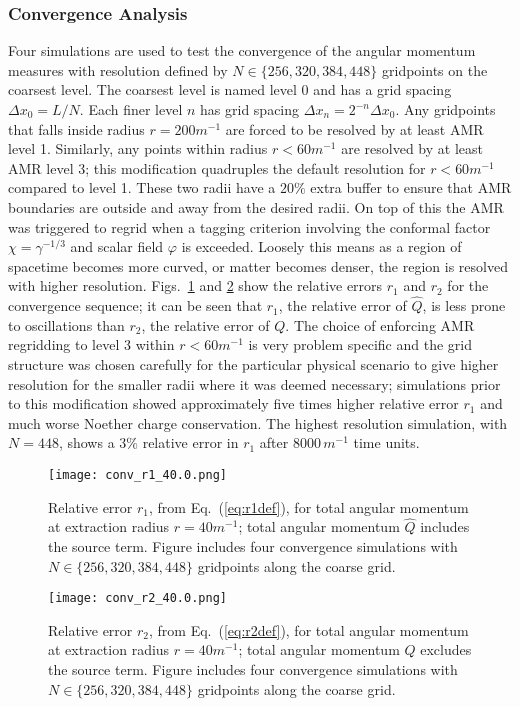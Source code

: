\subsubsection{Convergence Analysis}

Four simulations are used to test the convergence of the angular momentum measures with resolution defined by $N\in\{256,320,384,448\}$ gridpoints on the coarsest level. The coarsest level is named level $0$ and has a grid spacing $\Delta x_0 = L/N$. Each finer level $n$ has grid spacing $\Delta x_n = 2^{-n} \Delta x_0$. Any gridpoints that falls inside radius $r= 200 m^{-1}$ are forced to be resolved by at least AMR level 1. Similarly, any points within radius $r<60 m^{-1}$ are resolved by at least AMR level 3; this modification quadruples the default resolution for $r<60 m^{-1}$ compared to level 1. These two radii have a $20\%$ extra buffer to ensure that AMR boundaries are outside and away from the desired radii. On top of this the AMR was triggered to regrid when a tagging criterion involving the conformal factor $\chi = \gamma^{-1/3}$ and scalar field $\varphi$ is exceeded. Loosely this means as a region of spacetime becomes more curved, or matter becomes denser, the region is resolved with higher resolution. Figs.~\ref{fig:r1} and \ref{fig:r2} show the relative errors $r_1$ and $r_2$ for the convergence sequence; it can be seen that $r_1$, the relative error of $\hat Q$, is less prone to oscillations than $r_2$, the relative error of $Q$. The choice of enforcing AMR regridding to level 3 within $r<60 m^{-1}$ is very problem specific and the grid structure was chosen carefully for the particular physical scenario to give higher resolution for the smaller radii where it was deemed necessary; simulations prior to this modification showed approximately five times higher relative error $r_1$ and much worse Noether charge conservation. The highest resolution simulation, with $N=448$, shows a $3\%$ relative error in $r_1$ after $8000 \,m^{-1}$ time units.

\begin{figure}[h]
{\texttt{[image: conv\_r1\_40.0.png]}}
\caption{ Relative error $r_1$, from Eq.~(\ref{eq:r1def}), for total angular momentum at extraction radius $r=40 m^{-1}$; total angular momentum $\hat{Q}$ includes the source term. Figure includes four convergence simulations with $N\in\{256,320,384,448\}$ gridpoints along the coarse grid.}
\label{fig:r1}
\end{figure}
\begin{figure}[h]
{\texttt{[image: conv\_r2\_40.0.png]}}
\caption{ Relative error $r_2$, from Eq.~(\ref{eq:r2def}), for total angular momentum at extraction radius $r=40 m^{-1}$; total angular momentum ${Q}$ excludes the source term. Figure includes four convergence simulations with $N\in\{256,320,384,448\}$ gridpoints along the coarse grid.} 
\label{fig:r2}
\end{figure}


